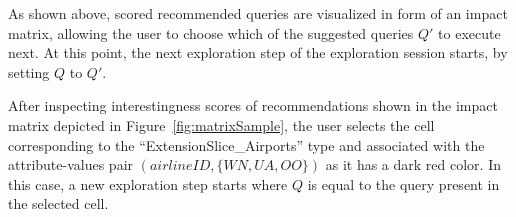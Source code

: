 As shown above, scored recommended queries are visualized in form of an impact matrix, allowing the user to choose which of the suggested queries $Q'$ to execute next. At this point, the next exploration step of the exploration session starts, by setting $Q$ to $Q'$. 
\begin{example} After inspecting interestingness scores of recommendations shown in the impact matrix depicted in Figure~\ref{fig:matrixSample}, the user selects the cell corresponding to the ``ExtensionSlice\_Airports'' type and associated with the attribute-values pair $(airlineID, \{WN,UA,OO\})$ as it has a dark red color.
In this case, a new exploration step starts where $Q$ is equal to the query present in the selected cell.
\end{example}




